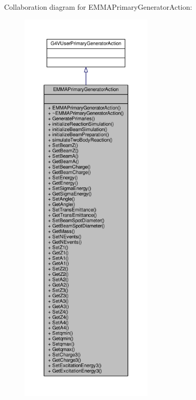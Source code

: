 Collaboration diagram for E\+M\+M\+A\+Primary\+Generator\+Action\+:
\nopagebreak
\begin{figure}[H]
\begin{center}
\leavevmode
\includegraphics[height=550pt]{classEMMAPrimaryGeneratorAction__coll__graph}
\end{center}
\end{figure}
